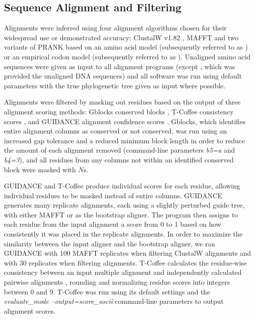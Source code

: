 \documentclass{article}
\begin{document}
\subsection*{Sequence Alignment and Filtering}

Alignments were inferred using four alignment algorithms chosen for
their widespread use or demonstrated accuracy: ClustalW v1.82
\citep{Thompson1994ClustalW}, MAFFT \citep{Katoh2005MAFFT} and two
variants of PRANK \citep{Loytynoja2005From} based on an amino acid
model (subsequently referred to as \pranka{}) or an empirical codon
model (subsequently referred to as \prankc{}). Unaligned amino acid
sequences were given as input to all alignment programs (except
\prankc{}, which was provided the unaligned DNA sequences) and all
software was run using default parameters with the true phylogenetic
tree given as input where possible.

Alignments were filtered by masking out residues based on the output
of three alignment scoring methods: Gblocks conserved blocks
\citep{Castresana2000Selection}, T-Coffee consistency scores
\citep{Notredame2000TCoffee,Notredame2003Using}, and GUIDANCE
alignment confidence scores \citep{Penn2010Alignment}. Gblocks, which
identifies entire alignment columns as conserved or not conserved, was
run using an increased gap tolerance and a reduced minimum block
length in order to reduce the amount of each alignment removed
(command-line parameters {\em b5=a} and {\em b4=3}), and all residues
from any columns not within an identified conserved block were masked
with $N$s.

GUIDANCE and T-Coffee produce individual scores for each residue,
allowing individual residues to be masked instead of entire
columns. GUIDANCE generates many replicate alignments, each using a
slightly perturbed guide tree, with either MAFFT or \pranka as the
bootstrap aligner. The program then assigns to each residue from the
input alignment a score from 0 to 1 based on how consistently it was
placed in the replicate alignments. In order to maximize the
similarity between the input aligner and the bootstrap aligner, we ran
GUIDANCE with 100 MAFFT replicates when filtering ClustalW alignments
and with 30 \pranka replicates when filtering \prankc
alignments. T-Coffee calculates the residue-wise consistency between
an input multiple alignment and independently calculated pairwise
alignments \citep{Notredame2003Using}, rounding and normalizing
residue scores into integers between 0 and 9. T-Coffee was run using
its default settings and the {\em evaluate\_mode
  --output=score\_ascii} command-line parameters to output alignment
scores.
\end{document}
